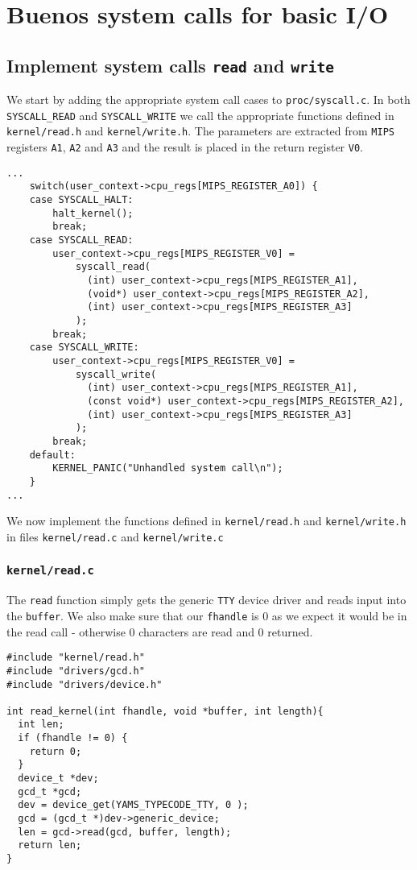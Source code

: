 \documentclass[a4paper,12pt]{article}
\begin{document}
\section{Buenos system calls for basic I/O}
\subsection{Implement system calls \texttt{read} and \texttt{write}}
We start by adding the appropriate system call cases to \texttt{proc/syscall.c}. In both \texttt{SYSCALL\_READ} and \texttt{SYSCALL\_WRITE} we call the appropriate functions defined in \texttt{kernel/read.h} and \texttt{kernel/write.h}. The parameters are extracted from \texttt{MIPS} registers \texttt{A1}, \texttt{A2} and \texttt{A3} and the result is placed in the return register \texttt{V0}.
\begin{lstlisting}
...
    switch(user_context->cpu_regs[MIPS_REGISTER_A0]) {
    case SYSCALL_HALT:
        halt_kernel();
        break;
    case SYSCALL_READ:
        user_context->cpu_regs[MIPS_REGISTER_V0] =
            syscall_read(
              (int) user_context->cpu_regs[MIPS_REGISTER_A1],
              (void*) user_context->cpu_regs[MIPS_REGISTER_A2],
              (int) user_context->cpu_regs[MIPS_REGISTER_A3]
            );
        break;
    case SYSCALL_WRITE:
        user_context->cpu_regs[MIPS_REGISTER_V0] =
            syscall_write(
              (int) user_context->cpu_regs[MIPS_REGISTER_A1],
              (const void*) user_context->cpu_regs[MIPS_REGISTER_A2],
              (int) user_context->cpu_regs[MIPS_REGISTER_A3]
            );
        break;
    default: 
        KERNEL_PANIC("Unhandled system call\n");
    }
...
\end{lstlisting}
We now implement the functions defined in \texttt{kernel/read.h} and \texttt{kernel/write.h} in files \texttt{kernel/read.c} and \texttt{kernel/write.c}

\subsubsection{\texttt{kernel/read.c}}
The \texttt{read} function simply gets the generic \texttt{TTY} device driver and reads input into the \texttt{buffer}. We also make sure that our \texttt{fhandle} is 0 as we expect it would be in the read call - otherwise 0 characters are read and 0 returned.

\begin{lstlisting}
#include "kernel/read.h"
#include "drivers/gcd.h"
#include "drivers/device.h"

int read_kernel(int fhandle, void *buffer, int length){
  int len;
  if (fhandle != 0) {
    return 0;
  }
  device_t *dev;
  gcd_t *gcd;
  dev = device_get(YAMS_TYPECODE_TTY, 0 );
  gcd = (gcd_t *)dev->generic_device;
  len = gcd->read(gcd, buffer, length);
  return len;
}
\end{lstlisting}
\end{document}
